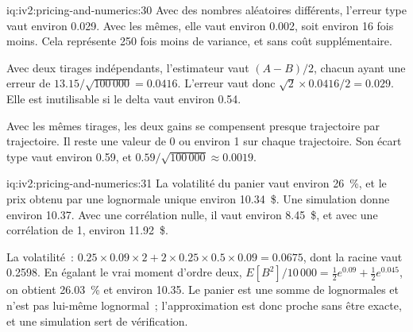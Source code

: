 \begin{solution}{iq:iv2:pricing-and-numerics:30}
Avec des nombres aléatoires différents, l'erreur type vaut environ 0.029. Avec les mêmes, elle vaut environ 0.002, soit environ 16 fois moins. Cela représente 250 fois moins de variance, et sans coût supplémentaire.

Avec deux tirages indépendants, l'estimateur vaut $(A - B)/2$, chacun ayant une erreur de $13.15/\sqrt{100\,000} = 0.0416$. L'erreur vaut donc $\sqrt 2 \times 0.0416/2 = 0.029$. Elle est inutilisable si le delta vaut environ 0.54.

Avec les mêmes tirages, les deux gains se compensent presque trajectoire par trajectoire. Il reste une valeur de 0 ou environ 1 sur chaque trajectoire. Son écart type vaut environ 0.59, et $0.59/\sqrt{100\,000} \approx 0.0019$.

\end{solution}

\begin{solution}{iq:iv2:pricing-and-numerics:31}
La volatilité du panier vaut environ 26~\%, et le prix obtenu par une lognormale unique environ 10.34~\$. Une simulation donne environ 10.37. Avec une corrélation nulle, il vaut environ 8.45~\$, et avec une corrélation de 1, environ 11.92~\$.

La volatilité~: $0.25 \times 0.09 \times 2 + 2 \times 0.25 \times 0.5 \times 0.09 = 0.0675$, dont la racine vaut 0.2598. En égalant le vrai moment d'ordre deux, $E[B^2]/10\,000 = \tfrac12e^{0.09} + \tfrac12e^{0.045}$, on obtient 26.03~\% et environ 10.35. Le panier est une somme de lognormales et n'est pas lui-même lognormal~; l'approximation est donc proche sans être exacte, et une simulation sert de vérification.

\end{solution}

